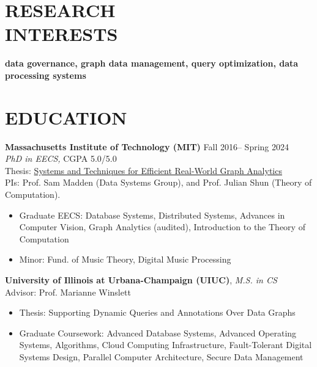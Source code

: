 \documentclass[centered,overlapped]{res}
\begin{document}

\address{joana.trindade@databricks.com, \url{http://joana.fyi}}

\begin{resume}

\section{RESEARCH \\ INTERESTS} \textbf{data governance, graph data management, query optimization, data processing systems}

\section{EDUCATION} \textbf{Massachusetts Institute of Technology (MIT)} \hfill Fall 2016-- Spring 2024 \\
  {\sl PhD in EECS,} CGPA 5.0/5.0 \\
  Thesis: \href{https://dspace.mit.edu/handle/1721.1/153832}{Systems and Techniques for Efficient Real-World Graph Analytics}\\
  PIs: Prof. Sam Madden (Data Systems Group), and Prof. Julian Shun (Theory of Computation).
  \begin{itemize}  \itemsep -2pt
  \item Graduate EECS: Database Systems, Distributed Systems, Advances in Computer Vision, Graph Analytics (audited), Introduction to the Theory of Computation
  \item Minor: Fund. of Music Theory, Digital Music Processing
  \end{itemize}

  \textbf{University of Illinois at Urbana-Champaign (UIUC)}, {\sl M.S. in CS} \\ %
  Advisor: Prof. Marianne Winslett
  \begin{itemize}  \itemsep -2pt
  \item Thesis: Supporting Dynamic Queries and Annotations Over Data Graphs
  \item Graduate Coursework: Advanced Database Systems, Advanced Operating Systems, Algorithms, Cloud Computing Infrastructure, Fault-Tolerant Digital Systems Design, Parallel Computer Architecture, Secure Data Management
  \end{itemize}


\end{resume}
\end{document}
